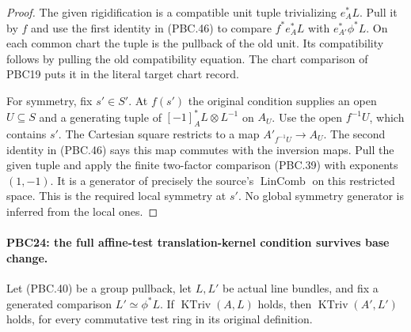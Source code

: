 \documentclass[11pt,a4paper]{article}
\numberwithin{equation}{section}
\theoremstyle{remark}\newtheorem{remark}[theorem]{Remark}
\begin{document}
\begin{proof}
The given rigidification is a compatible unit tuple
trivializing $e_A^*L$.  Pull it by $f$ and use the first
identity in (PBC.46) to compare
$f^*e_A^*L$ with $e_{A'}^*\phi^*L$.
On each common chart the tuple is the pullback of the old
unit.  Its compatibility follows by pulling the old
compatibility equation.  The chart comparison of PBC19
puts it in the literal target chart record.

For symmetry, fix $s'\in S'$.  At $f(s')$ the original
condition supplies an open $U\subseteq S$ and a
generating tuple of
$[-1]_A^*L\otimes L^{-1}$ on $A_U$.
Use the open $f^{-1}U$, which contains $s'$.
The Cartesian square restricts to a map
$A'_{f^{-1}U}\to A_U$.
The second identity in (PBC.46) says this map commutes
with the inversion maps.  Pull the given tuple and
apply the finite two-factor comparison (PBC.39) with
exponents $(1,-1)$.  It is a generator of precisely the
source's $\operatorname{LinComb}$ on this restricted
space.  This is the required local symmetry at $s'$.
No global symmetry generator is inferred from the local ones.
\end{proof}

\paragraph{PBC24: the full affine-test translation-kernel condition survives base change.}
\label{claim:PBC24}
Let (PBC.40) be a group pullback, let $L,L'$ be actual
line bundles, and fix a generated comparison
$L'\simeq\phi^*L$.
If $\operatorname{KTriv}(A,L)$ holds, then
$\operatorname{KTriv}(A',L')$ holds, for every commutative
test ring in its original definition.
\end{document}
